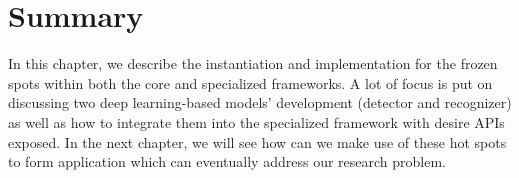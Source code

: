 \section{Summary}
\label{sec:fw-inst-summary}

In this chapter, we describe the instantiation and implementation for the
frozen spots within both the core and specialized frameworks. A lot of focus is
put on discussing two deep learning-based models' development (detector and
recognizer) as well as how to integrate them into the specialized framework
with desire APIs exposed.
In the next chapter, we will see how can we make use of these hot spots to form
application which can eventually address our research problem.
